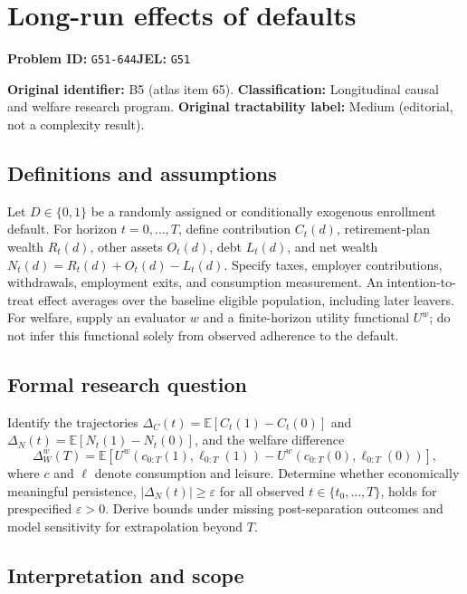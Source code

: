 \documentclass[11pt,a4paper]{article}
\begin{document}
\section*{Long-run effects of defaults}
\textbf{Problem ID:} \texttt{G51-644}\quad \textbf{JEL:} \texttt{G51}\par
\label{problem:OP-0065}
\label{atlas:prob:B5}

\noindent\textbf{Original identifier:} B5 (atlas item 65). \textbf{Classification:} Longitudinal causal and welfare research program. \textbf{Original tractability label:} Medium (editorial, not a complexity result).

\subsection*{Definitions and assumptions}

Let $D\in\{0,1\}$ be a randomly assigned or conditionally exogenous enrollment default. For horizon $t=0,\ldots,T$, define contribution $C_t(d)$, retirement-plan wealth $R_t(d)$, other assets $O_t(d)$, debt $L_t(d)$, and net wealth $N_t(d)=R_t(d)+O_t(d)-L_t(d)$. Specify taxes, employer contributions, withdrawals, employment exits, and consumption measurement. An intention-to-treat effect averages over the baseline eligible population, including later leavers. For welfare, supply an evaluator $w$ and a finite-horizon utility functional $U^w$; do not infer this functional solely from observed adherence to the default.

\subsection*{Formal research question}

Identify the trajectories $\Delta_C(t)=\mathbb E[C_t(1)-C_t(0)]$ and $\Delta_N(t)=\mathbb E[N_t(1)-N_t(0)]$, and the welfare difference
\[
\Delta_W^w(T)=\mathbb E[U^w(c_{0:T}(1),\ell_{0:T}(1))-U^w(c_{0:T}(0),\ell_{0:T}(0))],
\]
where $c$ and $\ell$ denote consumption and leisure. Determine whether economically meaningful persistence, $|\Delta_N(t)|\geq\varepsilon$ for all observed $t\in\{t_0,\ldots,T\}$, holds for prespecified $\varepsilon>0$. Derive bounds under missing post-separation outcomes and model sensitivity for extrapolation beyond $T$.

\subsection*{Interpretation and scope}
\end{document}
